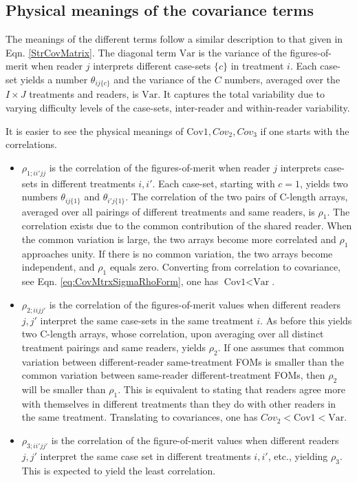 \documentclass[
]{book}
\begin{document}
\hypertarget{PhysicalMeaningsOfCovMatrix}{%
\subsection{Physical meanings of the covariance terms}\label{PhysicalMeaningsOfCovMatrix}}

The meanings of the different terms follow a similar description to that given in Eqn. \ref{StrCovMatrix}. The diagonal term \(\text{Var}\) is the variance of the figures-of-merit when reader \(j\) interprets different case-sets \(\{c\}\) in treatment \(i\). Each case-set yields a number \(\theta_{ij\{c\}}\) and the variance of the \(C\) numbers, averaged over the \(I \times J\) treatments and readers, is \(\text{Var}\). It captures the total variability due to varying difficulty levels of the case-sets, inter-reader and within-reader variability.

It is easier to see the physical meanings of \(\text{Cov1}, Cov_2, Cov_3\) if one starts with the correlations.

\begin{itemize}
\item
  \(\rho_{1;ii'jj}\) is the correlation of the figures-of-merit when reader \(j\) interprets case-sets in different treatments \(i,i'\). Each case-set, starting with \(c = 1\), yields two numbers \(\theta_{ij\{1\}}\) and \(\theta_{i'j\{1\}}\). The correlation of the two pairs of C-length arrays, averaged over all pairings of different treatments and same readers, is \(\rho_1\). The correlation exists due to the common contribution of the shared reader. When the common variation is large, the two arrays become more correlated and \(\rho_1\) approaches unity. If there is no common variation, the two arrays become independent, and \(\rho_1\) equals zero. Converting from correlation to covariance, see Eqn. \eqref{eq:CovMtrxSigmaRhoForm}, one has \(\text{Cov1} < \text{Var}\).
\item
  \(\rho_{2;iijj'}\) is the correlation of the figures-of-merit values when different readers \(j,j'\) interpret the same case-sets in the same treatment \(i\). As before this yields two C-length arrays, whose correlation, upon averaging over all distinct treatment pairings and same readers, yields \(\rho_2\). If one assumes that common variation between different-reader same-treatment FOMs is smaller than the common variation between same-reader different-treatment FOMs, then \(\rho_2\) will be smaller than \(\rho_1\). This is equivalent to stating that readers agree more with themselves in different treatments than they do with other readers in the same treatment. Translating to covariances, one has \(Cov_2 < \text{Cov1} < \text{Var}\).
\item
  \(\rho_{3;ii'jj'}\) is the correlation of the figure-of-merit values when different readers \(j,j'\) interpret the same case set in different treatments \(i,i'\), etc., yielding \(\rho_3\). This is expected to yield the least correlation.
\end{itemize}
\end{document}
